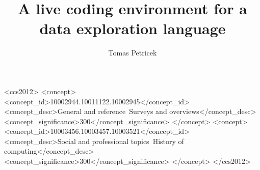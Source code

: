 \documentclass[english,submission]{programming}
\theoremstyle{plain}
\theoremstyle{definition}
\begin{document}
\title{A live coding environment for a data exploration language}

\author[a]{Tomas Petricek}

\begin{CCSXML}
<ccs2012>
<concept>
<concept_id>10002944.10011122.10002945</concept_id>
<concept_desc>General and reference~Surveys and overviews</concept_desc>
<concept_significance>300</concept_significance>
</concept>
<concept>
<concept_id>10003456.10003457.10003521</concept_id>
<concept_desc>Social and professional topics~History of computing</concept_desc>
<concept_significance>300</concept_significance>
</concept>
</ccs2012>
\end{CCSXML}

\maketitle
\end{document}
